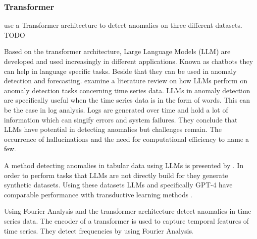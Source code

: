 \subsubsection{Transformer}
 use a Transformer architecture to detect anomalies on three different datasets. TODO









Based on the transformer architecture, Large Language Models (LLM) are developed and used increasingly in different applications. Known as chatbots they can help in language specific tasks. Beside that they can be used in anomaly detection and forecasting.  examine a literature review on how LLMs perform on anomaly detection tasks concerning time series data. LLMs in anomaly detection are specifically useful when the time series data is in the form of words. This can be the case in log analysis. Logs are generated over time and hold a lot of information which can singify errors and system failures. They conclude that LLMs have potential in detecting anomalies but challenges remain. The occurrence of hallucinations and the need for computational efficiency to name a few.

A method detecting anomalies in tabular data using LLMs is presented by . In order to perform tasks that LLMs are not directly build for they generate synthetic datasets. Using these datasets LLMs and specifically GPT-4 have comparable performance with transductive learning methods .

Using Fourier Analysis and the transformer architecture  detect anomalies in time series data. The encoder of a transformer is used to capture temporal features of time series. They detect frequencies by using Fourier Analysis.

